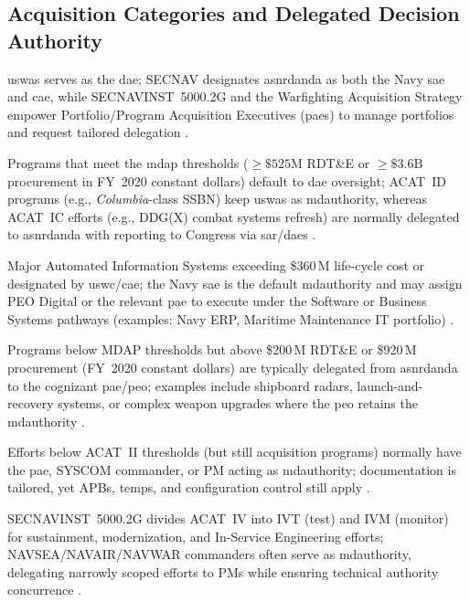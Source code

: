 \documentclass[../main.tex]{subfiles}
\begin{document}
\subsection{Acquisition Categories and Delegated Decision Authority}
\ac{uswas} serves as the \ac{dae}; SECNAV designates \ac{asnrdanda} as both the Navy \ac{sae} and \ac{cae}, while SECNAVINST~5000.2G and the Warfighting Acquisition Strategy empower Portfolio/Program Acquisition Executives (\acp{pae}) to manage portfolios and request tailored delegation \autocite{DoDD5000-01,SECNAV5000-2G,secwar-acq-transformation-2025}.
\begin{description}[style=nextline,labelsep=0.5em,font=\bfseries]
  \item[ACAT~I (MDAP).] Programs that meet the \ac{mdap} thresholds ($\geq\$525\text{M}$ RDT\&E or $\geq\$3.6\text{B}$ procurement in FY~2020 constant dollars) default to \ac{dae} oversight; ACAT~ID programs (e.g., \textit{Columbia}-class SSBN) keep \ac{uswas} as \ac{mdauthority}, whereas ACAT~IC efforts (e.g., DDG(X) combat systems refresh) are normally delegated to \ac{asnrdanda} with reporting to Congress via \ac{sar}/\ac{daes} \autocite{USC-10-4201,DoDI5000-85,edo-3-3-1-acq-policy-players-2025}.
  \item[ACAT~IA.] Major Automated Information Systems exceeding \$360\,M life-cycle cost or designated by \ac{uswc}/\ac{cae}; the Navy \ac{sae} is the default \ac{mdauthority} and may assign PEO Digital or the relevant \ac{pae} to execute under the Software or Business Systems pathways (examples: Navy ERP, Maritime Maintenance IT portfolio) \autocite{DoDI5000-02,DoDI5000-75}.
  \item[ACAT~II.] Programs below MDAP thresholds but above \$200\,M RDT\&E or \$920\,M procurement (FY~2020 constant dollars) are typically delegated from \ac{asnrdanda} to the cognizant \ac{pae}/\ac{peo}; examples include shipboard radars, launch-and-recovery systems, or complex weapon upgrades where the \ac{peo} retains the \ac{mdauthority} \autocite{DoDI5000-85,edo-3-3-1-acq-policy-players-2025}.
  \item[ACAT~III.] Efforts below ACAT~II thresholds (but still acquisition programs) normally have the \ac{pae}, SYSCOM commander, or PM acting as \ac{mdauthority}; documentation is tailored, yet APBs, \ac{temp}s, and configuration control still apply \autocite{DoDI5000-85,SECNAV5000-2G}.
  \item[ACAT~IV (DON unique).] SECNAVINST~5000.2G divides ACAT~IV into IVT (test) and IVM (monitor) for sustainment, modernization, and In-Service Engineering efforts; NAVSEA/NAVAIR/NAVWAR commanders often serve as \ac{mdauthority}, delegating narrowly scoped efforts to PMs while ensuring technical authority concurrence \autocite{SECNAV5000-2G}.
\end{description}
\end{document}
